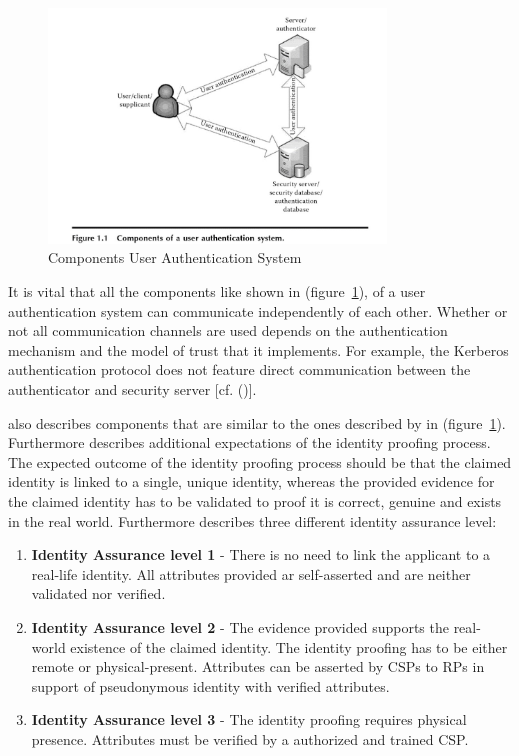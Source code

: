 \begin{figure}[h]
	\centering
	\includegraphics[width=0.8\textwidth]{images/componentsUserAuthenticationSystem}
	\caption[Componets Authentication]{Components User Authentication System}
	\label{fig:componentsuserauthenticationsystem}
\end{figure}


It is vital that all the components like shown in (figure~\ref{fig:componentsuserauthenticationsystem}), of a user authentication system can communicate independently of each other. Whether or not all communication channels are used depends on the authentication mechanism and the model of trust that it implements. For example, the Kerberos authentication protocol does not feature direct communication between the authenticator and security server [cf. (\cite{Todorov:2007:MUI})]. 

\cite{NIST:2017:DIGEIP} also describes components that are similar to the ones described by \cite{Todorov:2007:MUI} in (figure~\ref{fig:componentsuserauthenticationsystem}). Furthermore \cite{NIST:2017:DIGEIP} describes additional expectations of the identity proofing process. The expected outcome of the identity proofing process should be that the claimed identity is linked to a single, unique identity, whereas the provided evidence for the claimed identity has to be validated to proof it is correct, genuine and exists in the real world. Furthermore \cite{NIST:2017:DIGEIP} describes three different identity assurance level:

\begin{enumerate}
	\item \textbf{Identity Assurance level 1} - There is no need to link the applicant to a real-life identity. All attributes provided ar self-asserted and are neither validated nor verified.
	\item \textbf{Identity Assurance level 2} -  The evidence provided supports the real-world existence of the claimed identity. The identity proofing has to be either remote or physical-present. Attributes can be asserted by CSPs to RPs in support of pseudonymous identity with verified attributes. 
	\item \textbf{Identity Assurance level 3} - The identity proofing requires physical presence. Attributes must be verified by a authorized and trained CSP. 
\end{enumerate}
	


